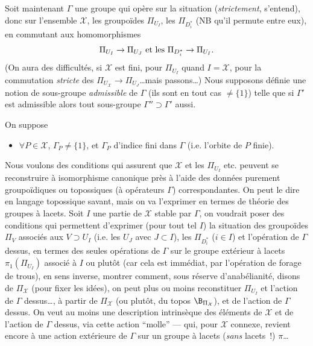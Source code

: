 Soit maintenant $\Gamma$ une groupe qui opère sur la situation (\emph{strictement}, s'entend), donc sur l'ensemble $\mathcal{X}$, les groupoïdes $\Pi_{U_I}$, les $\Pi_{D_i^\ast}$ (NB qu'il permute entre eux), en commutant aux homomorphismes 
$$
\Pi_{U_I}\to\Pi_{U_J}{\rm\ et\ les\ }\Pi_{D^*_i}
\to\Pi_{U_I}.
$$
(On aura des difficultés, si $\mathcal{X}$ est fini, pour $\Pi_{U_I}$ quand $I=\mathcal{X}$, pour la commutation \emph{stricte} des $\Pi_{U_\mathcal{X}}\to\Pi_{U_J}$\dots mais passons\dots) Nous supposons définie une notion de sous-groupe \emph{admissible} de $\Gamma$ (ils sont en tout cas $\ne \{1\}$) telle que si $\Gamma'$ est admissible alors tout sous-groupe $\Gamma''\supset\Gamma'$ aussi.  

On suppose
\begin{itemize}
	\item[(1$^\circ$)] $\forall P\in\mathcal{X}$, $\Gamma_P\ne\{1\}$, et $\Gamma_P$ d'indice fini dans $\Gamma$ (i.e. l'orbite de $P$ finie).
\end{itemize}
Nous voulons des conditions qui assurent que $\mathcal{X}$ et les $\Pi_{U_I}$ etc. peuvent se reconstruire à isomorphisme canonique près à l'aide des données purement groupoïdiques ou topossiques (à opérateurs $\Gamma$) correspondantes.  On peut le dire en langage topossique savant, mais on va l'exprimer en termes de théorie des groupes à lacets. Soit $I$ une partie de $\mathcal{X}$ stable par $\Gamma$, on voudrait poser des conditions qui permettent d'exprimer (pour tout tel $I$) la situation des groupoïdes $\Pi_V$ associés aux $V\supset U_I$ (i.e. les $U_J$ avec $J\subset  I$), les $\Pi_{D_i^\ast}$ ($i\in I$) et l'opération de $\Gamma$ dessus, en termes des seules opérations de $\Gamma$ sur le groupe extérieur à lacets $\pi_1(\Pi_{U_I})$ associé à $I$ ou plutôt (car cela est immédiat, par l'opération de forage de trous), en sens inverse, montrer comment, sous réserve d'anabélianité, disons de $\Pi_\mathcal{X}$ (pour fixer les idées), on peut plus ou moins reconstituer $\Pi_{U_I}$ et l'action de $\Gamma$ dessus\dots, à partir de $\Pi_\mathcal{X}$ (ou plutôt, du topos $\B_{\Pi_\mathcal{X}}$), et de l'action de $\Gamma$ dessus. On veut au moins une description intrinsèque des éléments de $\mathcal{X}$ et de l'action de $\Gamma$ dessus, via cette action ``molle'' --- qui, pour $\mathcal{X}$ connexe,  revient encore à une action extérieure de $\Gamma$ sur un groupe à lacets (\emph{sans}  lacets~!) $\pi$\dots

